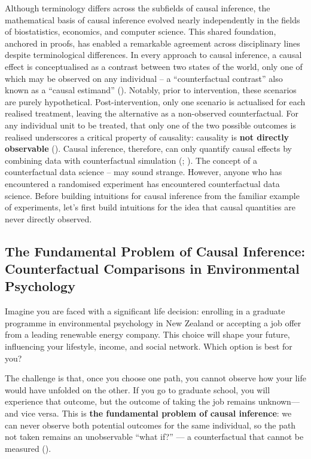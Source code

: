 \documentclass[
  singlecolumn]{article}
\begin{document}
Although terminology differs across the subfields of causal inference,
the mathematical basis of causal inference evolved nearly independently
in the fields of biostatistics, economics, and computer science. This
shared foundation, anchored in proofs, has enabled a remarkable
agreement across disciplinary lines despite terminological differences.
In every approach to causal inference, a causal effect is conceptualised
as a contrast between two states of the world, only one of which may be
observed on any individual -- a ``counterfactual contrast'' also known
as a ``causal estimand'' (). Notably, prior to intervention, these scenarios are
purely hypothetical. Post-intervention, only one scenario is actualised
for each realised treatment, leaving the alternative as a non-observed
counterfactual. For any individual unit to be treated, that only one of
the two possible outcomes is realised underscores a critical property of
causality: causality is \textbf{not directly observable}
(). Causal inference, therefore, can
only quantify causal effects by combining data with counterfactual
simulation (;
). The concept of
a counterfactual data science -- may sound strange. However, anyone who
has encountered a randomised experiment has encountered counterfactual
data science. Before building intuitions for causal inference from the
familiar example of experiments, let's first build intuitions for the
idea that causal quantities are never directly observed.

\subsection{The Fundamental Problem of Causal Inference: Counterfactual
Comparisons in Environmental
Psychology}\label{the-fundamental-problem-of-causal-inference-counterfactual-comparisons-in-environmental-psychology}

Imagine you are faced with a significant life decision: enrolling in a
graduate programme in environmental psychology in New Zealand or
accepting a job offer from a leading renewable energy company. This
choice will shape your future, influencing your lifestyle, income, and
social network. Which option is best for you?

The challenge is that, once you choose one path, you cannot observe how
your life would have unfolded on the other. If you go to graduate
school, you will experience that outcome, but the outcome of taking the
job remains unknown---and vice versa. This is \textbf{the fundamental
problem of causal inference}: we can never observe both potential
outcomes for the same individual, so the path not taken remains an
unobservable ``what if?'' --- a counterfactual that cannot be measured
().
\end{document}
